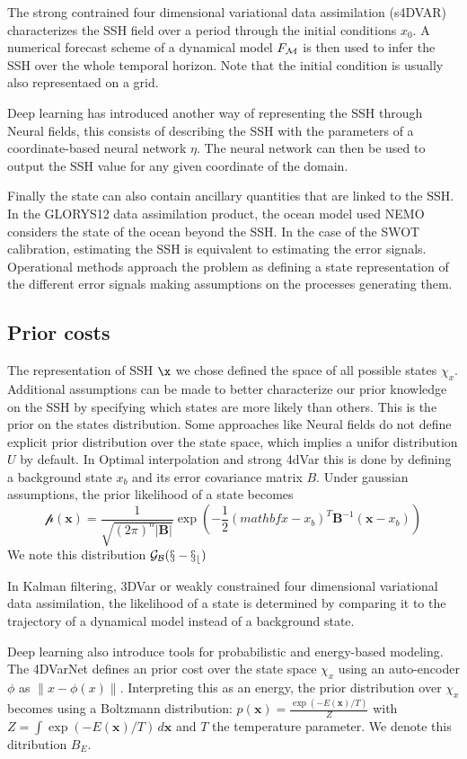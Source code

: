 \begin{bibunit}
  The strong contrained four dimensional variational data assimilation (s4DVAR)\cite{} characterizes the SSH field over a period through the initial conditions $x_0$. A numerical forecast scheme of a dynamical model $F_{\cal{M}}$ is then used to infer the SSH over the whole temporal horizon. Note that the initial condition is usually also representaed on a grid. 

Deep learning has introduced another way of representing the SSH through Neural fields\cite{}, this consists of describing the SSH with the parameters of a coordinate-based neural network $\eta$. The neural network can then be used to output the SSH value for any given coordinate of the domain.


Finally the state can also contain ancillary quantities that are linked to the SSH. In the GLORYS12\cite{} data assimilation product, the ocean model used NEMO\cite{} considers the state of the ocean beyond the SSH.
In the case of the SWOT calibration, estimating the SSH is equivalent to estimating the error signals. Operational methods approach the problem as defining a state representation of the different error signals making assumptions on the processes generating them.

\subsection{Prior costs}
The representation of SSH $\x$ we chose defined the space of all possible states $\chi_x$. Additional assumptions can be made to better characterize our prior knowledge on the SSH by specifying which states are more likely than others. This is the prior on the states distribution.
Some approaches like Neural fields do not define explicit prior distribution over the state space, which implies a unifor distribution $U$ by default.
In Optimal interpolation and strong 4dVar this is done by defining a background state $x_b$ and its error covariance matrix $B$. Under gaussian assumptions, the prior likelihood of a state becomes 
 $$\mathcal{p}(\mathbf{x}) = \frac{1}{\sqrt{(2\pi)^n |\mathbf{B}|}} \exp\left(-\frac{1}{2} (mathbf{x} - x_b)^T \mathbf{B}^{-1} (\mathbf{x} - x_b)\right)$$
  We note this distribution $\cal{G}_B(x - x_b)$

In Kalman filtering, 3DVar or weakly constrained four dimensional variational data assimilation, the likelihood of a state is determined by comparing it to the trajectory of a dynamical model instead of a background state.

  Deep learning also introduce tools for probabilistic and energy-based modeling. The 4DVarNet defines an prior cost over the state space $\chi_x$ using an auto-encoder $\phi$  as $\| x - \phi(x)\|$. Interpreting this as an energy, the prior distribution over $\chi_x$ becomes using a Boltzmann distribution:  $p(\mathbf{x}) = \frac{\exp(-E(\mathbf{x}) / T)}{Z}$ with $Z = \int \exp(-E(\mathbf{x}) / T) \, d\mathbf{x}$ and $T$ the temperature parameter. We denote this ditribution $B_{E}$.




\end{bibunit}
